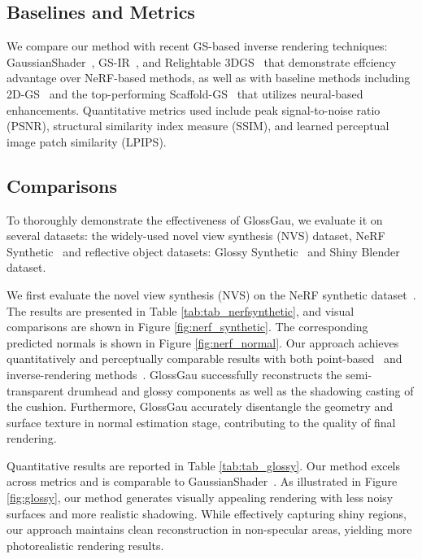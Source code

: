 \subsection{Baselines and Metrics}
We compare our method with recent GS-based inverse rendering techniques: GaussianShader~\cite{jiang2024gaussianshader}, GS-IR~\cite{liang2024gs}, and Relightable 3DGS~\cite{gao2023relightable} that demonstrate effciency advantage over NeRF-based methods, as well as with baseline methods including 2D-GS~\cite{Huang2DGS2024} and the top-performing Scaffold-GS~\cite{lu2024scaffold} that utilizes neural-based enhancements. Quantitative metrics used include peak signal-to-noise ratio (PSNR), structural similarity index measure (SSIM), and learned perceptual image patch similarity (LPIPS). 


\subsection{Comparisons}
To thoroughly demonstrate the effectiveness of GlossGau, we evaluate it on several datasets: the widely-used novel view synthesis (NVS) dataset, NeRF Synthetic~\cite{mildenhall2020nerf} and reflective object datasets: Glossy Synthetic~\cite{liu2023nero} and Shiny Blender~\cite{verbin2022ref} dataset. 

We first evaluate the novel view synthesis (NVS) on the NeRF synthetic dataset~\cite{mildenhall2020nerf}. The results are presented in Table \ref{tab:tab_nerfsynthetic}, and visual comparisons are shown in Figure \ref{fig:nerf_synthetic}. The corresponding predicted normals is shown in Figure \ref{fig:nerf_normal}. Our approach achieves quantitatively and perceptually comparable results with both point-based~\cite{Huang2DGS2024,lu2024scaffold} and inverse-rendering methods~\cite{jiang2024gaussianshader,gao2023relightable}. GlossGau successfully reconstructs the semi-transparent drumhead and glossy components as well as the shadowing casting of the cushion. Furthermore, GlossGau accurately disentangle the geometry and surface texture in normal estimation stage, contributing to the quality of final rendering. 


Quantitative results are reported in Table \ref{tab:tab_glossy}. Our method excels across metrics and is comparable to GaussianShader~\cite{jiang2024gaussianshader}. As illustrated in Figure \ref{fig:glossy},  our method generates visually appealing rendering with less noisy surfaces and more realistic shadowing. While effectively capturing shiny regions, our approach maintains clean reconstruction in non-specular areas, yielding more photorealistic rendering results.


